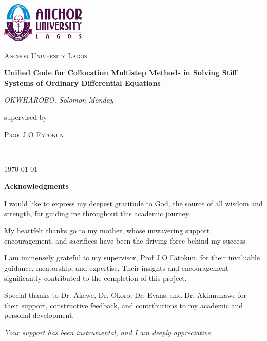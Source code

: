 \documentclass[a4paper, twoside]{report}
\begin{document}
\begin{titlepage}
   \centering
   \vspace*{1cm}
   \includegraphics[width=0.3\textwidth]{aul_logo.png}\par
   \vspace{1.5cm}
   {\scshape\LARGE Anchor University Lagos \par}
   \vspace{1cm}
   \vspace{1.5cm}
   {\huge\bfseries Unified Code for Collocation Multistep Methods in Solving Stiff Systems of Ordinary Differential Equations\par}
   \vspace{2cm}
   {\Large\itshape OKWHAROBO, Solomon Monday\par}
   \vfill
   supervised by\par
   \textsc{Prof J.O Fatokun}
  
   
    \\
   

   \vfill

   {\large \today\par}
\end{titlepage}


\begin{titlepage}
  \centering
  \vspace*{2cm}
  \LARGE\textbf{Acknowledgments}
  
  \vspace{1cm}
  \large
  I would like to express my deepest gratitude to God, the source of all wisdom and strength, for guiding me throughout this academic journey.

  \vspace{0.5cm}
  My heartfelt thanks go to my mother, whose unwavering support, encouragement, and sacrifices have been the driving force behind my success.

  \vspace{0.5cm}
  I am immensely grateful to my supervisor, Prof J.O Fatokun, for their invaluable guidance, mentorship, and expertise. Their insights and encouragement significantly contributed to the completion of this project.

  \vspace{0.5cm}
  Special thanks to Dr. Akewe, Dr. Okoro, Dr. Evans, and Dr. Akinnukawe for their support, constructive feedback, and contributions to my academic and personal development.

  \vspace{2cm}
  \textit{Your support has been instrumental, and I am deeply appreciative.}
\end{titlepage}
\end{document}
